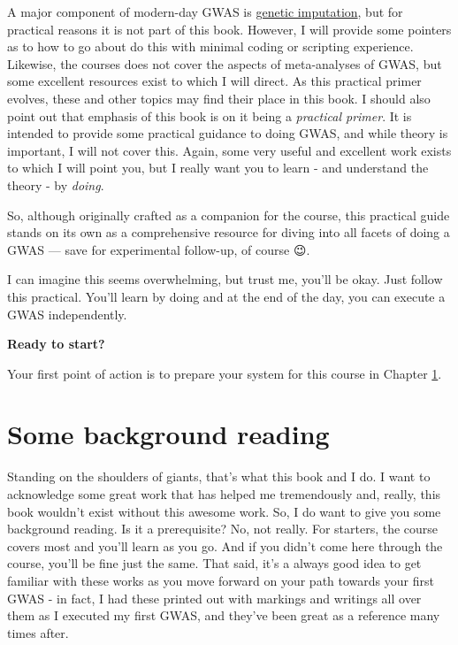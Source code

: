 \documentclass[
]{book}
\begin{document}
A major component of modern-day GWAS is \href{https://www.nature.com/articles/nrg2796}{genetic imputation}, but for practical reasons it is not part of this book. However, I will provide some pointers as to how to go about do this with minimal coding or scripting experience. Likewise, the courses does not cover the aspects of meta-analyses of GWAS, but some excellent resources exist to which I will direct. As this practical primer evolves, these and other topics may find their place in this book.
I should also point out that emphasis of this book is on it being a \emph{practical primer}. It is intended to provide some practical guidance to doing GWAS, and while theory is important, I will not cover this. Again, some very useful and excellent work exists to which I will point you, but I really want you to learn - and understand the theory - by \emph{doing}.

So, although originally crafted as a companion for the course, this practical guide stands on its own as a comprehensive resource for diving into all facets of doing a GWAS --- save for experimental follow-up, of course 😉.

I can imagine this seems overwhelming, but trust me, you'll be okay. Just follow this practical. You'll learn by doing and at the end of the day, you can execute a GWAS independently.

\textbf{Ready to start?}

Your first point of action is to prepare your system for this course in Chapter \ref{somebackgroundreading}.

\hypertarget{somebackgroundreading}{%
\chapter{Some background reading}\label{somebackgroundreading}}

Standing on the shoulders of giants, that's what this book and I do. I want to acknowledge some great work that has helped me tremendously and, really, this book wouldn't exist without this awesome work. So, I do want to give you some background reading. Is it a prerequisite? No, not really. For starters, the course covers most and you'll learn as you go. And if you didn't come here through the course, you'll be fine just the same. That said, it's a always good idea to get familiar with these works as you move forward on your path towards your first GWAS - in fact, I had these printed out with markings and writings all over them as I executed my first GWAS, and they've been great as a reference many times after.
\end{document}
